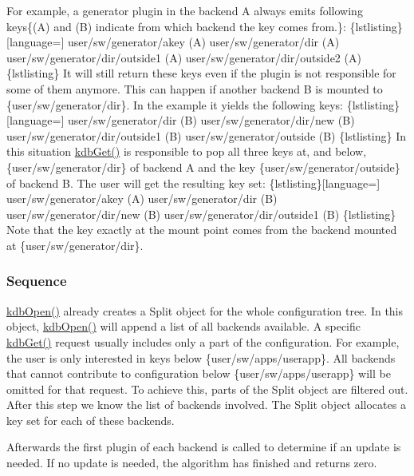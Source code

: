For example, a generator plugin in the backend A always emits following keys\{(A) and (B) indicate from which backend the key comes from.\}\+: \{lstlisting\}\mbox{[}language=\mbox{]} user/sw/generator/akey (A) user/sw/generator/dir (A) user/sw/generator/dir/outside1 (A) user/sw/generator/dir/outside2 (A) \{lstlisting\} It will still return these keys even if the plugin is not responsible for some of them anymore. This can happen if another backend B is mounted to \{user/sw/generator/dir\}. In the example it yields the following keys\+: \{lstlisting\}\mbox{[}language=\mbox{]} user/sw/generator/dir (B) user/sw/generator/dir/new (B) user/sw/generator/dir/outside1 (B) user/sw/generator/outside (B) \{lstlisting\} In this situation {\ttfamily \hyperlink{group__kdb_ga28e385fd9cb7ccfe0b2f1ed2f62453a1}{kdb\+Get()}} is responsible to pop all three keys at, and below, \{user/sw/generator/dir\} of backend A and the key \{user/sw/generator/outside\} of backend B. The user will get the resulting key set\+: \{lstlisting\}\mbox{[}language=\mbox{]} user/sw/generator/akey (A) user/sw/generator/dir (B) user/sw/generator/dir/new (B) user/sw/generator/dir/outside1 (B) \{lstlisting\} Note that the key exactly at the mount point comes from the backend mounted at \{user/sw/generator/dir\}.

\subsubsection*{Sequence}

{\ttfamily \hyperlink{group__kdb_ga6808defe5870f328dd17910aacbdc6ca}{kdb\+Open()}} already creates a {\ttfamily Split} object for the whole configuration tree. In this object, {\ttfamily \hyperlink{group__kdb_ga6808defe5870f328dd17910aacbdc6ca}{kdb\+Open()}} will append a list of all backends available. A specific {\ttfamily \hyperlink{group__kdb_ga28e385fd9cb7ccfe0b2f1ed2f62453a1}{kdb\+Get()}} request usually includes only a part of the configuration. For example, the user is only interested in keys below \{user/sw/apps/userapp\}. All backends that cannot contribute to configuration below \{user/sw/apps/userapp\} will be omitted for that request. To achieve this, parts of the {\ttfamily Split} object are filtered out. After this step we know the list of backends involved. The {\ttfamily Split} object allocates a key set for each of these backends.

Afterwards the first plugin of each backend is called to determine if an update is needed. If no update is needed, the algorithm has finished and returns zero.

